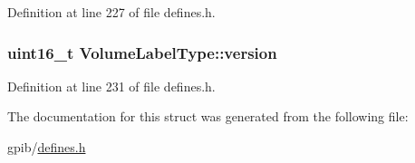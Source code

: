 Definition at line 227 of file defines.\+h.

\subsubsection[{\texorpdfstring{version}{version}}]{\setlength{\rightskip}{0pt plus 5cm}uint16\+\_\+t Volume\+Label\+Type\+::version}\hypertarget{structVolumeLabelType_a59f56fd1f28549bc625aeaaa57c8d0d2}{}\label{structVolumeLabelType_a59f56fd1f28549bc625aeaaa57c8d0d2}


Definition at line 231 of file defines.\+h.



The documentation for this struct was generated from the following file\+:\begin{DoxyCompactItemize}
\item 
gpib/\hyperlink{defines_8h}{defines.\+h}\end{DoxyCompactItemize}
